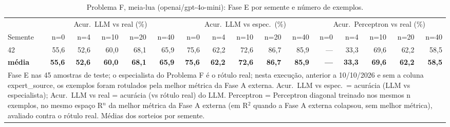 \begin{table}[htbp]
\centering
\footnotesize
\caption{Problema F, meia-lua (openai/gpt-4o-mini): Fase E por semente e número de exemplos.}
\label{tab:bloco2_F_meialua_faseE_nshot_gpt4mini}
\begin{tabular}{lrrrrrrrrrrrrrrr}
\toprule
 & \multicolumn{5}{c}{Acur.\ LLM vs real (\%)} & \multicolumn{5}{c}{Acur.\ LLM vs espec.\ (\%)} & \multicolumn{5}{c}{Acur.\ Perceptron vs real (\%)} \\ \cmidrule(lr){2-6} \cmidrule(lr){7-11} \cmidrule(lr){12-16}
Semente & n=0 & n=4 & n=10 & n=20 & n=40 & n=0 & n=4 & n=10 & n=20 & n=40 & n=0 & n=4 & n=10 & n=20 & n=40 \\
\midrule
42 & 55,6 & 52,6 & 60,0 & 68,1 & 65,9 & 75,6 & 62,2 & 72,6 & 86,7 & 85,9 & — & 33,3 & 69,6 & 62,2 & 58,5 \\
\midrule
\textbf{média} & \textbf{55,6} & \textbf{52,6} & \textbf{60,0} & \textbf{68,1} & \textbf{65,9} & \textbf{75,6} & \textbf{62,2} & \textbf{72,6} & \textbf{86,7} & \textbf{85,9} & \textbf{—} & \textbf{33,3} & \textbf{69,6} & \textbf{62,2} & \textbf{58,5} \\
\bottomrule
\multicolumn{16}{p{0.95\linewidth}}{\footnotesize Fase E nas 45 amostras de teste; o especialista do Problema F é o rótulo real; nesta execução, anterior a 10/10/2026 e sem a coluna expert\_source, os exemplos foram rotulados pela melhor métrica da Fase A externa. Acur.\ LLM vs espec.\ = acurácia (LLM vs especialista); Acur.\ LLM vs real = acurácia (vs rótulo real) do LLM. Perceptron = Perceptron diagonal treinado nos mesmos n exemplos, no mesmo espaço R$^n$ da melhor métrica da Fase A externa (em R$^2$ quando a Fase A externa colapsou, sem melhor métrica), avaliado contra o rótulo real. Médias dos sorteios por semente.} \\
\end{tabular}
\end{table}

